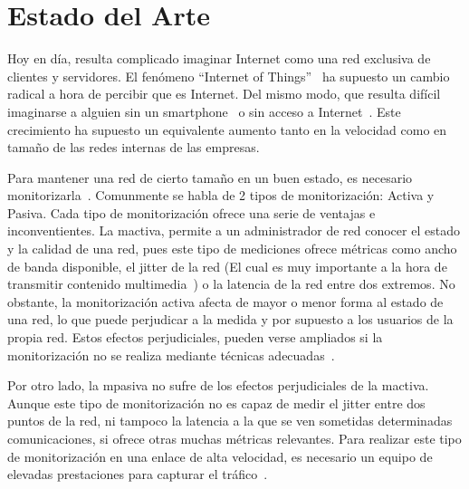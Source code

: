 \chapter{Estado del Arte\label{sec:estado_del_arte}}

Hoy en día, resulta complicado imaginar Internet como una red exclusiva de clientes y servidores. El fenómeno ``Internet of Things''~\cite{Atzori20102787} ha supuesto un cambio radical a hora de percibir que es Internet. Del mismo modo, que resulta difícil imaginarse a alguien sin un smartphone~\cite{bib:introduccion:smartphone} o sin acceso a Internet~\cite{bib:internet:growth}. Este crecimiento ha supuesto un equivalente aumento tanto en la velocidad como en tamaño de las redes internas de las empresas.

Para mantener una red de cierto tamaño en un buen estado, es necesario monitorizarla~\cite{de2013proactive}. Comunmente se habla de 2 tipos de monitorización: Activa y Pasiva. Cada tipo de monitorización ofrece una serie de ventajas e inconventientes. La \gls{mactiva}, permite a un administrador de red conocer el estado y la calidad de una red, pues este tipo de mediciones ofrece métricas como ancho de banda disponible, el jitter de la red (El cual es muy importante a la hora de transmitir contenido multimedia~\cite{dpdk:Leir1306,hernandomeasuring,garcia2014low}) o la latencia de la red entre dos extremos. No obstante, la monitorización activa afecta de mayor o menor forma al estado de una red, lo que puede perjudicar a la medida y por supuesto a los usuarios de la propia red. Estos efectos perjudiciales, pueden verse ampliados si la monitorización no se realiza mediante técnicas adecuadas~\cite{Ramos20111435}.

Por otro lado, la \gls{mpasiva} no sufre de los efectos perjudiciales de la \gls{mactiva}. Aunque este tipo de monitorización no es capaz de medir el jitter entre dos puntos de la red, ni tampoco la latencia a la que se ven sometidas determinadas comunicaciones, si ofrece otras muchas métricas relevantes. Para realizar este tipo de monitorización en una enlace de alta velocidad, es necesario un equipo de elevadas prestaciones para capturar el tráfico~\cite{dpdk:netfpga,dpdk:packetshader,moreno2012TFM,dpdk:victor:ref:1,dpdk:victor:ref:2,dpdk2015}.

